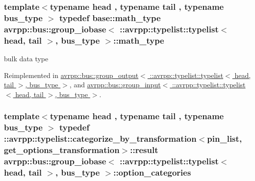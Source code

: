 \hypertarget{structavrpp_1_1bus_1_1group__iobase_3_01_1_1avrpp_1_1typelist_1_1typelist_3_01head_00_01tail_01_4_00_01bus__type_01_4_a143651b666f2d9a6e9f236b04b6dbb52}{
\subsubsection[{math\_\-type}]{\setlength{\rightskip}{0pt plus 5cm}template$<$typename head , typename tail , typename bus\_\-type $>$ typedef base::math\_\-type avrpp::bus::group\_\-iobase$<$ ::{\bf avrpp::typelist::typelist}$<$ head, tail $>$, bus\_\-type $>$::{\bf math\_\-type}}}
\label{structavrpp_1_1bus_1_1group__iobase_3_01_1_1avrpp_1_1typelist_1_1typelist_3_01head_00_01tail_01_4_00_01bus__type_01_4_a143651b666f2d9a6e9f236b04b6dbb52}


bulk data type 



Reimplemented in \hyperlink{structavrpp_1_1bus_1_1group__output_3_01_1_1avrpp_1_1typelist_1_1typelist_3_01head_00_01tail_01_4_00_01bus__type_01_4_a00f5369cee28e57effbee4aafabd0d47}{avrpp::bus::group\_\-output$<$ ::avrpp::typelist::typelist$<$ head, tail $>$, bus\_\-type $>$}, and \hyperlink{structavrpp_1_1bus_1_1group__input_3_01_1_1avrpp_1_1typelist_1_1typelist_3_01head_00_01tail_01_4_00_01bus__type_01_4_a23cdc8f3ffca194e693a006c5140244d}{avrpp::bus::group\_\-input$<$ ::avrpp::typelist::typelist$<$ head, tail $>$, bus\_\-type $>$}.

\hypertarget{structavrpp_1_1bus_1_1group__iobase_3_01_1_1avrpp_1_1typelist_1_1typelist_3_01head_00_01tail_01_4_00_01bus__type_01_4_a1aff854df5990b5d460cd2431a29527b}{
\subsubsection[{option\_\-categories}]{\setlength{\rightskip}{0pt plus 5cm}template$<$typename head , typename tail , typename bus\_\-type $>$ typedef ::avrpp::typelist::categorize\_\-by\_\-transformation$<${\bf pin\_\-list}, {\bf get\_\-options\_\-transformation}$>$::result avrpp::bus::group\_\-iobase$<$ ::{\bf avrpp::typelist::typelist}$<$ head, tail $>$, bus\_\-type $>$::{\bf option\_\-categories}}}
\label{structavrpp_1_1bus_1_1group__iobase_3_01_1_1avrpp_1_1typelist_1_1typelist_3_01head_00_01tail_01_4_00_01bus__type_01_4_a1aff854df5990b5d460cd2431a29527b}


